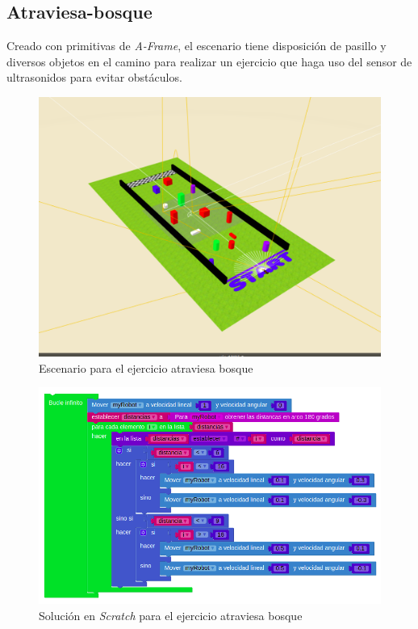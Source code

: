 \subsection{Atraviesa-bosque}
\label{subsec:atraviesabosque}

Creado con primitivas de \textit{A-Frame}, el escenario tiene disposición de pasillo y diversos objetos en el camino para realizar un ejercicio que haga uso del sensor de ultrasonidos para evitar obstáculos.

    \begin{figure}[H]
    \centering
    \includegraphics[scale=0.4]{img/atraviesabosque-indiv.png}
    \caption{Escenario para el ejercicio atraviesa bosque} 
    \label{fig:atraviesaBosqueind}
    \end{figure}

    \begin{figure}[H]
    \centering
    \includegraphics[scale=0.3]{img/atraviesaBosqueCodigo.png}
    \caption{Solución en \textit{Scratch} para el ejercicio atraviesa bosque} 
    \label{fig:bosqueSolution}
    \end{figure}
    


